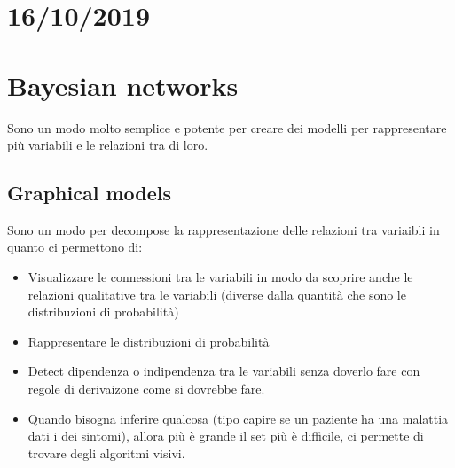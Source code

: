 \chapter{16/10/2019}
\chapter{Bayesian networks}
Sono un modo molto semplice e potente per creare dei modelli per rappresentare più variabili e le relazioni tra di loro. \newline
\section{Graphical models}
Sono un modo per decompose la rappresentazione delle relazioni tra variaibli in quanto ci permettono di:
\begin{itemize}
	\item Visualizzare le connessioni tra le variabili in modo da scoprire anche le relazioni qualitative tra le variabili (diverse dalla quantità che sono le distribuzioni di probabilità)
	\item Rappresentare le distribuzioni di probabilità 
	\item Detect dipendenza o indipendenza tra le variabili senza doverlo fare con regole di derivaizone come si dovrebbe fare. 
	\item Quando bisogna inferire qualcosa (tipo capire se un paziente ha una malattia dati i dei sintomi), allora più è grande il set più è difficile, ci permette di trovare degli algoritmi visivi. 
\end{itemize}
